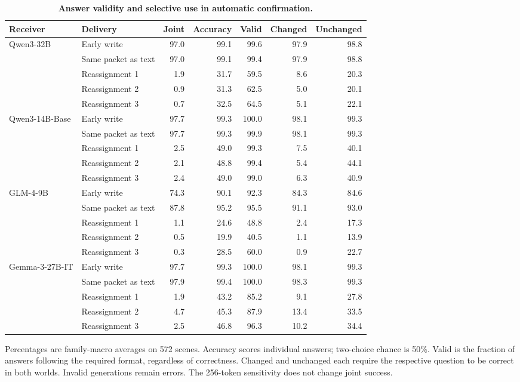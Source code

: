 \begin{table}[!htbp]
\caption{\textbf{Answer validity and selective use in automatic confirmation.}}
\label{tab:recovery_controls}
\centering\small
\setlength{\tabcolsep}{3pt}\renewcommand{\arraystretch}{1.08}
\begin{tabular*}{\linewidth}{@{\extracolsep{\fill}}llrrrrr@{}}
\toprule
Receiver & Delivery & Joint & Accuracy & Valid & Changed & Unchanged \\
\midrule
Qwen3-32B & Early write & 97.0 & 99.1 & 99.6 & 97.9 & 98.8 \\
 & Same packet as text & 97.0 & 99.1 & 99.4 & 97.9 & 98.8 \\
 & Reassignment 1 & 1.9 & 31.7 & 59.5 & 8.6 & 20.3 \\
 & Reassignment 2 & 0.9 & 31.3 & 62.5 & 5.0 & 20.1 \\
 & Reassignment 3 & 0.7 & 32.5 & 64.5 & 5.1 & 22.1 \\
Qwen3-14B-Base & Early write & 97.7 & 99.3 & 100.0 & 98.1 & 99.3 \\
 & Same packet as text & 97.7 & 99.3 & 99.9 & 98.1 & 99.3 \\
 & Reassignment 1 & 2.5 & 49.0 & 99.3 & 7.5 & 40.1 \\
 & Reassignment 2 & 2.1 & 48.8 & 99.4 & 5.4 & 44.1 \\
 & Reassignment 3 & 2.4 & 49.0 & 99.0 & 6.3 & 40.9 \\
GLM-4-9B & Early write & 74.3 & 90.1 & 92.3 & 84.3 & 84.6 \\
 & Same packet as text & 87.8 & 95.2 & 95.5 & 91.1 & 93.0 \\
 & Reassignment 1 & 1.1 & 24.6 & 48.8 & 2.4 & 17.3 \\
 & Reassignment 2 & 0.5 & 19.9 & 40.5 & 1.1 & 13.9 \\
 & Reassignment 3 & 0.3 & 28.5 & 60.0 & 0.9 & 22.7 \\
Gemma-3-27B-IT & Early write & 97.7 & 99.3 & 100.0 & 98.1 & 99.3 \\
 & Same packet as text & 97.9 & 99.4 & 100.0 & 98.3 & 99.3 \\
 & Reassignment 1 & 1.9 & 43.2 & 85.2 & 9.1 & 27.8 \\
 & Reassignment 2 & 4.7 & 45.3 & 87.9 & 13.4 & 33.5 \\
 & Reassignment 3 & 2.5 & 46.8 & 96.3 & 10.2 & 34.4 \\
\bottomrule
\end{tabular*}
\par\vspace{3pt}
{\footnotesize\raggedright Percentages are family-macro averages on 572 scenes. Accuracy scores individual answers; two-choice chance is 50\%. Valid is the fraction of answers following the required format, regardless of correctness. Changed and unchanged each require the respective question to be correct in both worlds. Invalid generations remain errors. The 256-token sensitivity does not change joint success.\par}
\end{table}
